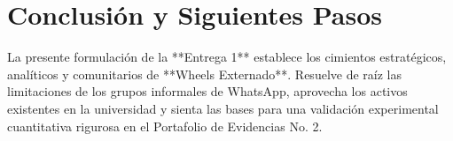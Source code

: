 \documentclass[11pt,a4paper]{article}
\begin{document}
\section{Conclusión y Siguientes Pasos}
La presente formulación de la **Entrega 1** establece los cimientos estratégicos, analíticos y comunitarios de **Wheels Externado**. Resuelve de raíz las limitaciones de los grupos informales de WhatsApp, aprovecha los activos existentes en la universidad y sienta las bases para una validación experimental cuantitativa rigurosa en el Portafolio de Evidencias No. 2.
\end{document}
